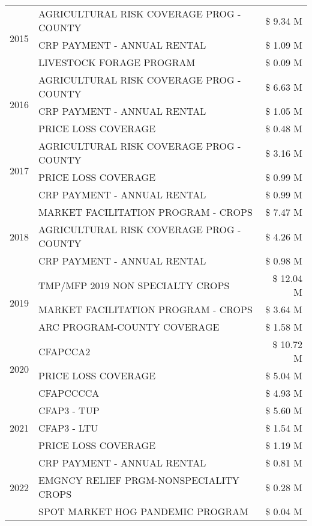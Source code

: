 \begin{tabular}{llr}
\cline{1-3}
\multirow[t]{3}{*}{2015} & AGRICULTURAL RISK COVERAGE PROG - COUNTY & \$ 9.34 M \\
 & CRP PAYMENT - ANNUAL RENTAL & \$ 1.09 M \\
 & LIVESTOCK FORAGE PROGRAM & \$ 0.09 M \\
\cline{1-3}
\multirow[t]{3}{*}{2016} & AGRICULTURAL RISK COVERAGE PROG - COUNTY & \$ 6.63 M \\
 & CRP PAYMENT - ANNUAL RENTAL & \$ 1.05 M \\
 & PRICE LOSS COVERAGE & \$ 0.48 M \\
\cline{1-3}
\multirow[t]{3}{*}{2017} & AGRICULTURAL RISK COVERAGE PROG - COUNTY & \$ 3.16 M \\
 & PRICE LOSS COVERAGE & \$ 0.99 M \\
 & CRP PAYMENT - ANNUAL RENTAL & \$ 0.99 M \\
\cline{1-3}
\multirow[t]{3}{*}{2018} & MARKET FACILITATION PROGRAM - CROPS & \$ 7.47 M \\
 & AGRICULTURAL RISK COVERAGE PROG - COUNTY & \$ 4.26 M \\
 & CRP PAYMENT - ANNUAL RENTAL & \$ 0.98 M \\
\cline{1-3}
\multirow[t]{3}{*}{2019} & TMP/MFP 2019 NON SPECIALTY CROPS & \$ 12.04 M \\
 & MARKET FACILITATION PROGRAM - CROPS & \$ 3.64 M \\
 & ARC PROGRAM-COUNTY COVERAGE & \$ 1.58 M \\
\cline{1-3}
\multirow[t]{3}{*}{2020} & CFAPCCA2 & \$ 10.72 M \\
 & PRICE LOSS COVERAGE & \$ 5.04 M \\
 & CFAPCCCCA & \$ 4.93 M \\
\cline{1-3}
\multirow[t]{3}{*}{2021} & CFAP3 - TUP & \$ 5.60 M \\
 & CFAP3 - LTU & \$ 1.54 M \\
 & PRICE LOSS COVERAGE & \$ 1.19 M \\
\cline{1-3}
\multirow[t]{3}{*}{2022} & CRP PAYMENT - ANNUAL RENTAL & \$ 0.81 M \\
 & EMGNCY RELIEF PRGM-NONSPECIALITY CROPS & \$ 0.28 M \\
 & SPOT MARKET HOG PANDEMIC PROGRAM & \$ 0.04 M \\
\cline{1-3}
\bottomrule
\end{tabular}
